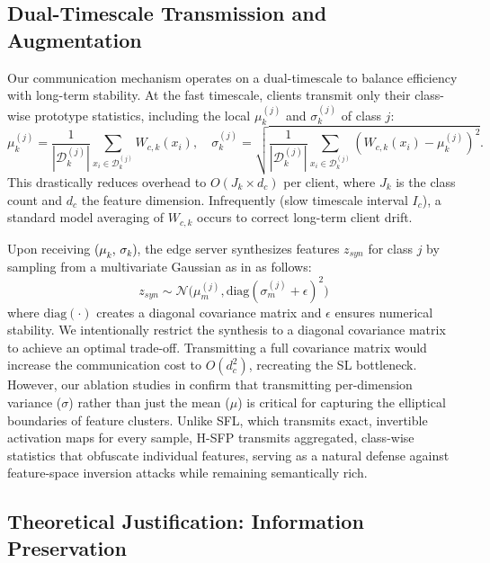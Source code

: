 \subsection{Dual-Timescale Transmission and Augmentation}
\label{sec:transmission_augmentation}
Our communication mechanism operates on a dual-timescale to balance efficiency with long-term stability. At the fast timescale, clients transmit only their class-wise prototype statistics, including the local $\mu_{k}^{(j)}$ and $\sigma_{k}^{(j)}$ of class $j$:
\begin{equation}
    \mu_k^{(j)} = \frac{1}{|\mathcal{D}_k^{(j)}|} \sum_{x_i \in \mathcal{D}_k^{(j)}} W_{c,k}(x_i), \quad
    \sigma_k^{(j)} = \sqrt{\frac{1}{|\mathcal{D}_k^{(j)}|} \sum_{x_i \in \mathcal{D}_k^{(j)}} (W_{c,k}(x_i) - \mu_k^{(j)})^2}.
    \label{mean_std_client}
\end{equation}
This drastically reduces overhead to $O(J_k \times d_c)$ per client, where $J_k$ is the class count and $d_c$ the feature dimension. Infrequently (slow timescale interval $I_c$), a standard model averaging of $W_{c,k}$ occurs to correct long-term client drift. 

Upon receiving \textcolor{black}{($\mu_k$, $\sigma_k$)}, the edge server synthesizes features $z_{syn}$ for class $j$ by sampling from a multivariate Gaussian as in \cite{9578909,Nguyen_2026_CVPR} as follows:
\begin{equation}
    \label{eq:synthesis}
    z_{syn} \sim \mathcal{N}\big(\mu_m^{(j)}, \text{diag}(\sigma_m^{(j)} + \epsilon)^2\big)
\end{equation}
where $\text{diag}(\cdot)$ creates a diagonal covariance matrix and $\epsilon$ ensures numerical stability. We intentionally restrict the synthesis to a diagonal covariance matrix to achieve an optimal trade-off. Transmitting a full covariance matrix would increase the communication cost to $O(d_c^2)$, recreating the SL bottleneck. However, our ablation studies in  confirm that transmitting per-dimension variance ($\sigma$) rather than just the mean ($\mu$) is critical for capturing the elliptical boundaries of feature clusters. Unlike SFL, which transmits exact, invertible activation maps for every sample, H-SFP transmits aggregated, class-wise statistics that obfuscate individual features, serving as a natural defense against feature-space inversion attacks while remaining semantically rich.

\subsection{Theoretical Justification: Information Preservation}
\label{sec:mmd_theory}
    
